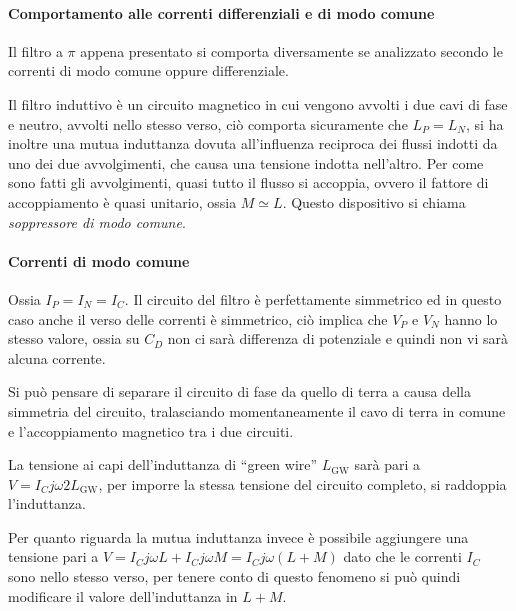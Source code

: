 \paragraph{Comportamento alle correnti differenziali e di modo comune}
Il filtro a $\pi$ appena presentato si comporta diversamente se analizzato
secondo le correnti di modo comune oppure differenziale.

Il filtro induttivo è un circuito magnetico in cui vengono avvolti i due 
cavi di fase e neutro, avvolti nello stesso verso,
ciò comporta sicuramente che $L_P = L_N$, si ha inoltre una mutua induttanza
dovuta all'influenza reciproca dei flussi indotti da uno dei due avvolgimenti, 
che causa una tensione indotta nell'altro. Per come sono fatti gli
avvolgimenti, quasi tutto il flusso si accoppia, ovvero il fattore di accoppiamento 
è quasi unitario, ossia $M\simeq L$. Questo dispositivo si chiama 
\textit{soppressore di modo comune}.

\paragraph{Correnti di modo comune} Ossia $I_P = I_N = I_C$.
Il circuito del filtro è perfettamente simmetrico ed in questo caso
anche il verso delle correnti è simmetrico, ciò implica che $V_P$ e $V_N$ hanno
lo stesso valore, ossia su $C_D$ non ci sarà differenza di potenziale e quindi non
vi sarà alcuna corrente. 

Si può pensare di separare il circuito di fase da quello di terra
a causa della simmetria del circuito, tralasciando momentaneamente il cavo di terra
in comune e l'accoppiamento magnetico tra i due circuiti.

\begin{figure}[h] %
 \centering
 \begin{circuitikz}
 
 \end{circuitikz}
\end{figure}

La tensione ai capi dell'induttanza di ``green wire''  $L_{\text{GW}}$ sarà
pari a $V = I_C j \omega 2L_{\text{GW}}$, per imporre la stessa tensione 
del circuito completo, si raddoppia l'induttanza.

Per quanto riguarda la mutua induttanza invece è possibile aggiungere una tensione
pari a $V = I_C j \omega L + I_C j \omega M = I_C j \omega (L+M)$ dato che le correnti
$I_C$ sono nello stesso verso, per tenere conto di questo fenomeno si può quindi
modificare il valore dell'induttanza in $L+M$.

